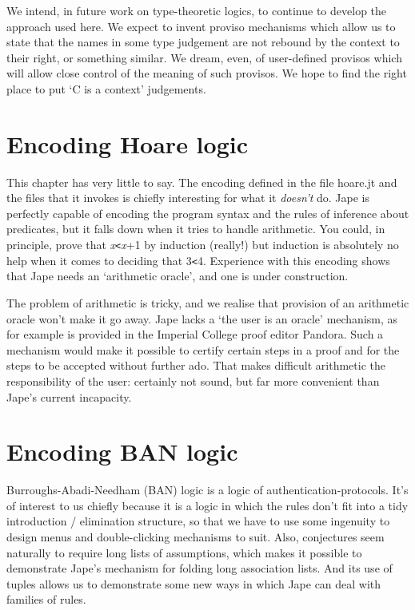 \documentclass[11pt]{book}
\begin{document}
We intend, in future work on type-theoretic logics, to continue to develop the approach used here. We expect to invent proviso mechanisms which allow us to state that the names in some type judgement are not rebound by the context to their right, or something similar. We dream, even, of user-defined provisos which will allow close control of the meaning of such provisos. We hope to find the right place to put `C is a context' judgements.



\chapter{Encoding Hoare logic}


This chapter has very little to say. The encoding defined in the file hoare.jt and the files that it invokes is chiefly interesting for what it \textit{doesn't} do. Jape is perfectly capable of encoding the program syntax and the rules of inference about predicates, but it falls down when it tries to handle arithmetic. You could, in principle, prove that \textit{x}\texttt{<}\textit{x}+1 by induction (really!) but induction is absolutely no help when it comes to deciding that 3\texttt{<}4. Experience with this encoding shows that Jape needs an `arithmetic oracle', and one is under construction.


The problem of arithmetic is tricky, and we realise that provision of an arithmetic oracle won't make it go away. Jape lacks a `the user is an oracle' mechanism, as for example is provided in the Imperial College proof editor Pandora. Such a mechanism would make it possible to certify certain steps in a proof and for the steps to be accepted without further ado. That makes difficult arithmetic the responsibility of the user: certainly not sound, but far more convenient than Jape's current incapacity.\\


\chapter{Encoding BAN logic}


Burroughs-Abadi-Needham (BAN) logic is a logic of authentication-protocols. It's of interest to us chiefly because it is a logic in which the rules don't fit into a tidy introduction / elimination structure, so that we have to use some ingenuity to design menus and double-clicking mechanisms to suit. Also, conjectures seem naturally to require long lists of assumptions, which makes it possible to demonstrate Jape's mechanism for folding long association lists. And its use of tuples allows us to demonstrate some new ways in which Jape can deal with families of rules.
\end{document}
